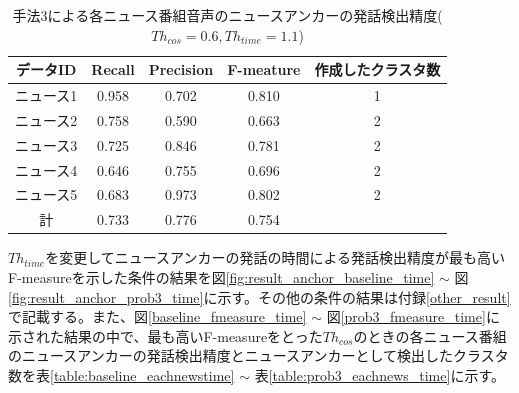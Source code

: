\begin{table}[H]
  \begin{center}
    \caption{手法3による各ニュース番組音声のニュースアンカーの発話検出精度($Th_{cos}=0.6,Th_{time}=1.1$) \label{table:prob3_eachnews}}
    \begin{tabular}{|c||c|c|c|c|} \hline
データID & Recall & Precision & F-meature & 作成したクラスタ数\\ \hline
ニュース1 & 0.958 & 0.702 & 0.810 & 1 \\ \hline
ニュース2 & 0.758 & 0.590 & 0.663 & 2 \\ \hline
ニュース3 & 0.725 & 0.846 & 0.781 & 2 \\ \hline
ニュース4 & 0.646 & 0.755 & 0.696 & 2 \\ \hline
ニュース5 & 0.683 & 0.973 & 0.802 & 2 \\ \hline
計 & 0.733 & 0.776 & 0.754 &  \\ \hline
    \end{tabular}
  \end{center}
\end{table}




\vspace{0.2in}\par
$Th_{time}$を変更してニュースアンカーの発話の時間による発話検出精度が最も高いF-measureを示した条件の結果を図\ref{fig:result_anchor_baseline_time} $\sim$ 図\ref{fig:result_anchor_prob3_time}に示す。その他の条件の結果は付録\ref{other_result}で記載する。また、図\ref{baseline_fmeasure_time} $\sim$ 図\ref{prob3_fmeasure_time}に示された結果の中で、最も高いF-measureをとった$Th_{cos}$のときの各ニュース番組のニュースアンカーの発話検出精度とニュースアンカーとして検出したクラスタ数を表\ref{table:baseline_eachnewstime} $\sim$ 表\ref{table:prob3_eachnews_time}に示す。


